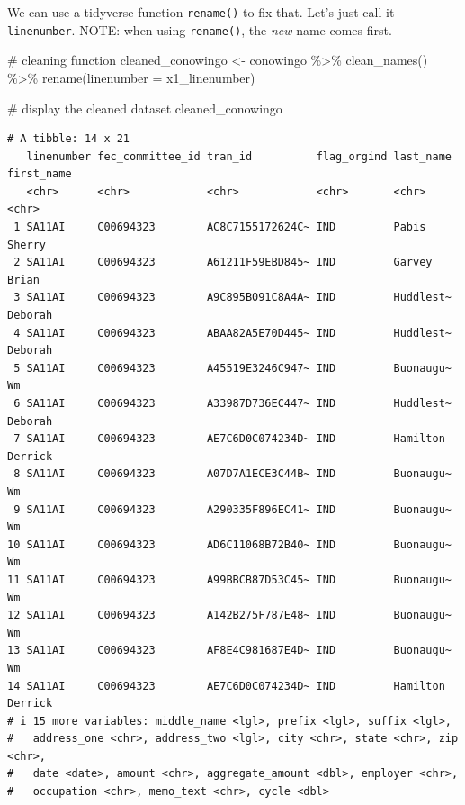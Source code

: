 \documentclass[
  letterpaper,
  DIV=11,
  numbers=noendperiod]{scrreprt}
\newenvironment{Shaded}{\begin{snugshade}}{\end{snugshade}}
\newcommand{\AttributeTok}[1]{\textcolor[rgb]{0.40,0.45,0.13}{#1}}
\newcommand{\CommentTok}[1]{\textcolor[rgb]{0.37,0.37,0.37}{#1}}
\newcommand{\FunctionTok}[1]{\textcolor[rgb]{0.28,0.35,0.67}{#1}}
\newcommand{\NormalTok}[1]{\textcolor[rgb]{0.00,0.23,0.31}{#1}}
\newcommand{\OtherTok}[1]{\textcolor[rgb]{0.00,0.23,0.31}{#1}}
\newcommand{\SpecialCharTok}[1]{\textcolor[rgb]{0.37,0.37,0.37}{#1}}
\begin{document}
We can use a tidyverse function \texttt{rename()} to fix that. Let's
just call it \texttt{linenumber}. NOTE: when using \texttt{rename()},
the \emph{new} name comes first.

\begin{Shaded}
\begin{Highlighting}[]
\CommentTok{\# cleaning function}
\NormalTok{cleaned\_conowingo }\OtherTok{\textless{}{-}}\NormalTok{ conowingo }\SpecialCharTok{\%\textgreater{}\%}
  \FunctionTok{clean\_names}\NormalTok{() }\SpecialCharTok{\%\textgreater{}\%}
  \FunctionTok{rename}\NormalTok{(}\AttributeTok{linenumber =}\NormalTok{ x1\_linenumber)}

\CommentTok{\# display the cleaned dataset}
\NormalTok{cleaned\_conowingo}
\end{Highlighting}
\end{Shaded}

\begin{verbatim}
# A tibble: 14 x 21
   linenumber fec_committee_id tran_id          flag_orgind last_name first_name
   <chr>      <chr>            <chr>            <chr>       <chr>     <chr>     
 1 SA11AI     C00694323        AC8C7155172624C~ IND         Pabis     Sherry    
 2 SA11AI     C00694323        A61211F59EBD845~ IND         Garvey    Brian     
 3 SA11AI     C00694323        A9C895B091C8A4A~ IND         Huddlest~ Deborah   
 4 SA11AI     C00694323        ABAA82A5E70D445~ IND         Huddlest~ Deborah   
 5 SA11AI     C00694323        A45519E3246C947~ IND         Buonaugu~ Wm        
 6 SA11AI     C00694323        A33987D736EC447~ IND         Huddlest~ Deborah   
 7 SA11AI     C00694323        AE7C6D0C074234D~ IND         Hamilton  Derrick   
 8 SA11AI     C00694323        A07D7A1ECE3C44B~ IND         Buonaugu~ Wm        
 9 SA11AI     C00694323        A290335F896EC41~ IND         Buonaugu~ Wm        
10 SA11AI     C00694323        AD6C11068B72B40~ IND         Buonaugu~ Wm        
11 SA11AI     C00694323        A99BBCB87D53C45~ IND         Buonaugu~ Wm        
12 SA11AI     C00694323        A142B275F787E48~ IND         Buonaugu~ Wm        
13 SA11AI     C00694323        AF8E4C981687E4D~ IND         Buonaugu~ Wm        
14 SA11AI     C00694323        AE7C6D0C074234D~ IND         Hamilton  Derrick   
# i 15 more variables: middle_name <lgl>, prefix <lgl>, suffix <lgl>,
#   address_one <chr>, address_two <lgl>, city <chr>, state <chr>, zip <chr>,
#   date <date>, amount <chr>, aggregate_amount <dbl>, employer <chr>,
#   occupation <chr>, memo_text <chr>, cycle <dbl>
\end{verbatim}
\end{document}
